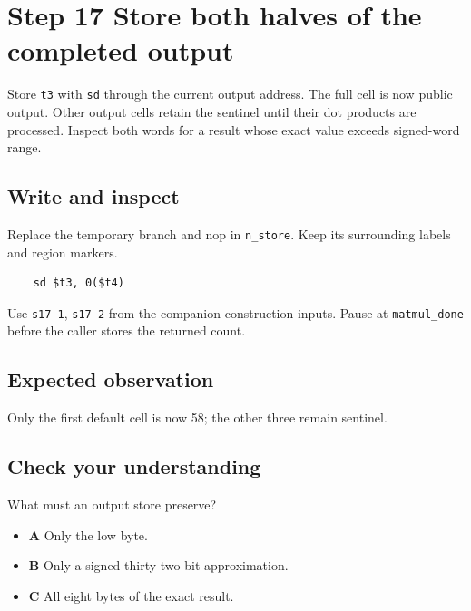 \section{Step 17 Store both halves of the completed output}\label{matmul-s17}

Store \texttt{t3} with \texttt{sd} through the current output address. The full cell is now public output. Other output cells retain the sentinel until their dot products are processed. Inspect both words for a result whose exact value exceeds signed-word range.

\subsection{Write and inspect}
Replace the temporary branch and nop in \texttt{n\_store}. Keep its surrounding labels and region markers.

\begin{verbatim}
    sd $t3, 0($t4)
\end{verbatim}
Use \texttt{s17-1}, \texttt{s17-2} from the companion construction inputs. Pause at \texttt{matmul\_done} before the caller stores the returned count.

\subsection{Expected observation}
Only the first default cell is now 58; the other three remain sentinel.

\subsection{Check your understanding}
What must an output store preserve?

\begin{itemize}
  \item \textbf{A} Only the low byte.
  \item \textbf{B} Only a signed thirty-two-bit approximation.
  \item \textbf{C} All eight bytes of the exact result.
\end{itemize}
